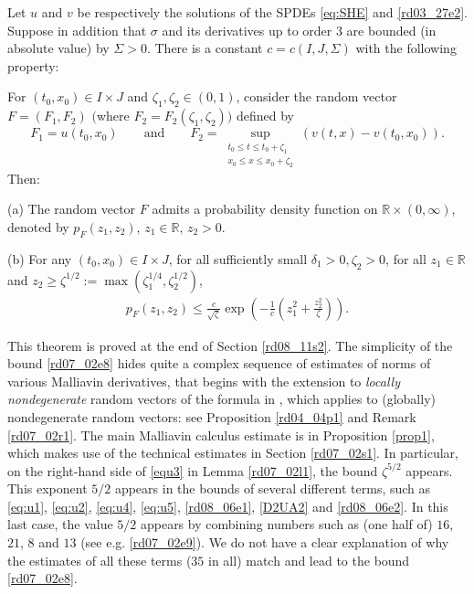 \documentclass[12pt,a4paper]{article}
\newcommand{\R}{{\mathbb{R}}}
\newcommand {\deltah}{{\zeta}}
\newcommand{\<}{\langle}
\renewcommand{\>}{\rangle}
\begin{document}
\begin{theorem} \label{thm1} 
Let $u$ and $v$ be respectively the solutions of the SPDEs \eqref{eq:SHE} and \eqref{rd03_27e2}. 
Suppose in addition that $\sigma$ and its derivatives up to order 3 are bounded (in absolute value) by $\Sigma > 0$.
There is a constant $c=c(I,J, \Sigma)$ with the following property:

For $(t_0,x_0) \in I\times J$ and  $\deltah_1, \deltah_2\in (0,1)$,  consider the random vector $F=(F_1, F_2)$ $($where $F_2 = F_2(\deltah_1, \deltah_2))$ defined by
\begin{equation}\label{rd07_30e1}
     F_1=u(t_0,x_0)\qquad\text{and}\qquad F_2=  \sup _{\substack {t_0\le t \le t_0+\deltah_1 \\ x_0\le x \le x_0+\deltah_2}}
(v(t,x)-v(t_0,x_0)).
\end{equation}
Then:

    (a)  The random vector $F$ admits a probability density function on $\R\times (0, \infty)$, denoted by $p_{F}(z_1,z_2)$, $z_1\in \R$, $z_2>0$.  
     
     (b)  For any  $(t_0,x_0)\in I\times J$,  for all sufficiently small  $\delta_1> 0,\zeta_2>0$, for all $z_1\in \R$ and $z_2 \ge \deltah^{1/2}:= \max(\deltah_1^{1/4}, \deltah_2^{1/2})$,
\begin{align}\label{rd07_02e8}
   p_{F}(z_1,z_2) \le \frac{c}{\sqrt{\deltah}} \exp\left(-\frac{1}{c} \left(z_1^2 + \frac{z_2^2}{\deltah}\right) \right).
\end{align}
\end{theorem}

This theorem is proved at the end of Section \ref{rd08_11s2}. The simplicity of the bound \eqref{rd07_02e8} hides quite a complex sequence of estimates of norms of various Malliavin derivatives, that begins with the extension to {\em locally nondegenerate} random vectors of the formula in \cite[Proposition 2.1.5]{nualart2006}, which applies to (globally) nondegenerate random vectors: see Proposition \ref{rd04_04p1} and Remark \ref{rd07_02r1}. The main Malliavin calculus estimate is in Proposition \ref{prop1}, which makes use of the technical estimates in Section \ref{rd07_02s1}. In particular, on the right-hand side of \eqref{equ3} in Lemma \ref{rd07_02l1}, the bound $\zeta^{5/2}$ appears. This exponent $5/2$ appears in the bounds of several different terms, such as \eqref{eq:u1}, \eqref{eq:u2}, \eqref{eq:u4}, \eqref{eq:u5}, \eqref{rd08_06e1}, \eqref{D2UA2} and \eqref{rd08_06e2}. In this last case, the value $5/2$ appears by combining numbers such as (one half of) $16$, $21$, $8$ and $13$ (see e.g. \eqref{rd07_02e9}). We do not have a clear explanation of why the estimates of all these terms ($35$ in all) match and lead to the bound \eqref{rd07_02e8}.
\bigskip
\end{document}

